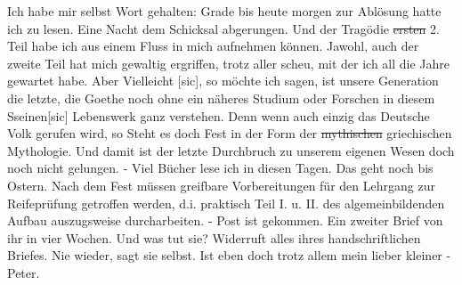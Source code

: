\def\day{24. April 1943}
\mktitle

Ich habe mir selbst Wort gehalten: Grade bis heute morgen zur Abl\"{o}sung hatte ich zu lesen.
Eine Nacht dem Schicksal abgerungen.
Und der Trag\"{o}die \st{ersten} 2. Teil habe ich aus einem Fluss in mich aufnehmen k\"{o}nnen.
Jawohl, auch der zweite Teil hat mich gewaltig ergriffen, trotz aller scheu, mit der ich all die Jahre gewartet habe.
Aber Vielleicht{\color{red} [sic]}, so m\"{o}chte ich sagen, ist unsere Generation die letzte, die Goethe noch ohne ein n\"{a}heres Studium oder Forschen in diesem Sseinen{\color{red}[sic] } Lebenswerk ganz verstehen.
Denn wenn auch einzig das Deutsche Volk gerufen wird, so Steht es doch Fest in der Form der \st{mythischen} griechischen Mythologie.
Und damit ist der letzte Durchbruch zu unserem eigenen Wesen doch noch nicht gelungen.
- Viel B\"{u}cher lese ich in diesen Tagen.
Das geht noch bis Ostern.
Nach dem Fest m\"{u}ssen greifbare Vorbereitungen f\"{u}r den Lehrgang zur Reifepr\"{u}fung getroffen werden, d.i. praktisch Teil I. u. II. des algemeinbildenden Aufbau auszugsweise durcharbeiten.
- Post ist gekommen.
Ein zweiter Brief von ihr in vier Wochen.
Und was tut sie?
Widerruft alles ihres handschriftlichen Briefes.
Nie wieder, sagt sie selbst.
Ist eben doch trotz allem mein lieber kleiner - Peter.

\clearpage
